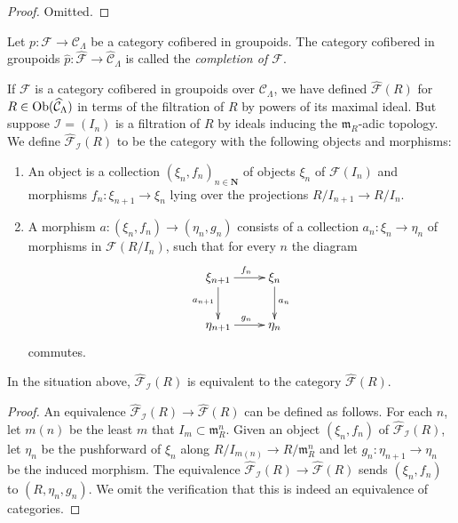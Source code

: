 \begin{proof}
Omitted.
\end{proof}

\begin{definition}
Let $p: \mathcal F \rightarrow \mathcal C_{\Lambda}$ be a category cofibered in 
groupoids.  The category cofibered in groupoids $\widehat{p}: \widehat{\mathcal 
F} \rightarrow \widehat{\mathcal C}_{\Lambda}$ is called the \emph{completion 
of $\mathcal F$}.
\end{definition}

\noindent
If $\mathcal F$ is a category cofibered in groupoids over $\mathcal 
C_{\Lambda}$, we have defined $\widehat{\mathcal F}(R)$ for $R \in 
\textnormal{Ob}(\widehat{\mathcal C}_{\Lambda})$ in terms of the filtration of 
$R$ by powers of its maximal ideal.  But suppose $\mathcal I = (I_{n})$ is a 
filtration of $R$ by ideals inducing the $\mathfrak{m}_{R}$-adic topology.  We 
define $\widehat{\mathcal{F}}_{\mathcal I}(R)$ to be the category with the 
following objects and morphisms:
\begin{enumerate}
\item An object is a collection $(\xi_{n}, f_{n})_{n \in \mathbf{N}}$ of 
objects $\xi_{n}$ of $\mathcal F(I_{n})$ and morphisms $f_{n}: \xi_{n+1} 
\rightarrow \xi_{n}$ lying over the projections $R/I_{n+1} \rightarrow R/I_{n}$.
\item A morphism $a: (\xi_n,f_n) \rightarrow (\eta_n, g_n)$ consists of a 
collection $a_n: \xi_n \rightarrow \eta_n$ of morphisms in $\mathcal 
F(R/I_{n})$, such that for every $n$ the diagram
\[
\xymatrix{
\xi_{n+1} \ar[r]^{f_{n}} \ar[d]_{a_{n+1}} & \xi_{n} \ar[d]^{a_{n}} \\
\eta_{n+1} \ar[r]^{g_{n}} & \eta_{n} 
}
\]
commutes.
\end{enumerate}

\begin{lemma}
\label{lemma-formal-objects-different-filtration}
In the situation above, $\widehat{\mathcal{F}}_{\mathcal I}(R)$ is equivalent 
to the category $\widehat{\mathcal F}(R)$.
\end{lemma}

\begin{proof}
An equivalence $\widehat{\mathcal{F}}_{\mathcal I}(R) \rightarrow 
\widehat{\mathcal F}(R)$ can be defined as follows.  For each $n$, let $m(n)$ 
be the least $m$ that $I_{m} \subset \mathfrak{m}_{R}^{n}$.  Given an object 
$(\xi_n,f_n)$ of $\widehat{\mathcal{F}}_{\mathcal I}(R)$, let $\eta_{n}$ be the 
pushforward of $\xi_{n}$ along $R/I_{m(n)} \rightarrow R/\mathfrak{m}_{R}^{n}$ 
and let $g_{n}: \eta_{n+1} \rightarrow \eta_{n}$ be the induced morphism.  The 
equivalence $\widehat{\mathcal{F}}_{\mathcal I}(R) \rightarrow 
\widehat{\mathcal F}(R)$ sends $(\xi_n,f_n)$ to $(R,\eta_n,g_n)$.  We omit the 
verification that this is indeed an equivalence of categories.
\end{proof}

